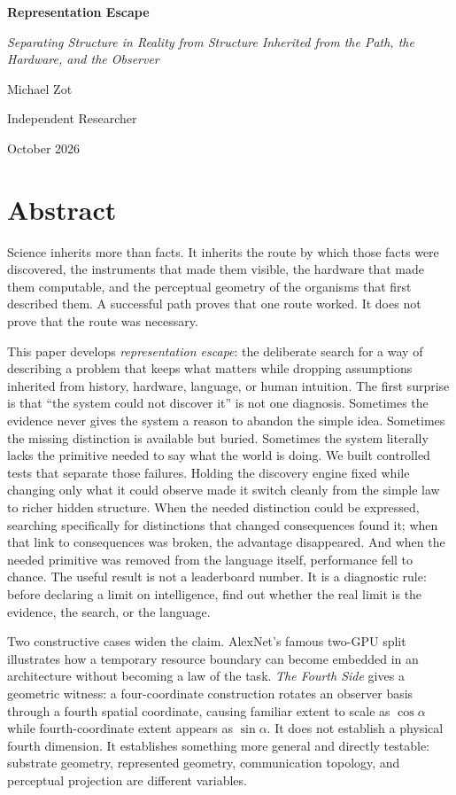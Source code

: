 \documentclass[11pt]{article}
\begin{document}
\begin{center}
{\LARGE\bfseries Representation Escape}\par
\vspace{0.45em}
{\large\itshape Separating Structure in Reality from Structure Inherited from the Path, the Hardware, and the Observer}\par
\vspace{1.05em}
{\large Michael Zot}\par
Independent Researcher\par
October 2026
\end{center}

\section*{Abstract}
Science inherits more than facts. It inherits the route by which those facts were discovered, the instruments that made them visible, the hardware that made them computable, and the perceptual geometry of the organisms that first described them. A successful path proves that one route worked. It does not prove that the route was necessary.

This paper develops \emph{representation escape}: the deliberate search for a way of describing a problem that keeps what matters while dropping assumptions inherited from history, hardware, language, or human intuition. The first surprise is that ``the system could not discover it'' is not one diagnosis. Sometimes the evidence never gives the system a reason to abandon the simple idea. Sometimes the missing distinction is available but buried. Sometimes the system literally lacks the primitive needed to say what the world is doing. We built controlled tests that separate those failures. Holding the discovery engine fixed while changing only what it could observe made it switch cleanly from the simple law to richer hidden structure. When the needed distinction could be expressed, searching specifically for distinctions that changed consequences found it; when that link to consequences was broken, the advantage disappeared. And when the needed primitive was removed from the language itself, performance fell to chance. The useful result is not a leaderboard number. It is a diagnostic rule: before declaring a limit on intelligence, find out whether the real limit is the evidence, the search, or the language.

Two constructive cases widen the claim. AlexNet's famous two-GPU split illustrates how a temporary resource boundary can become embedded in an architecture without becoming a law of the task. \emph{The Fourth Side} gives a geometric witness: a four-coordinate construction rotates an observer basis through a fourth spatial coordinate, causing familiar extent to scale as $\cos\alpha$ while fourth-coordinate extent appears as $\sin\alpha$. It does not establish a physical fourth dimension. It establishes something more general and directly testable: substrate geometry, represented geometry, communication topology, and perceptual projection are different variables.
\end{document}

